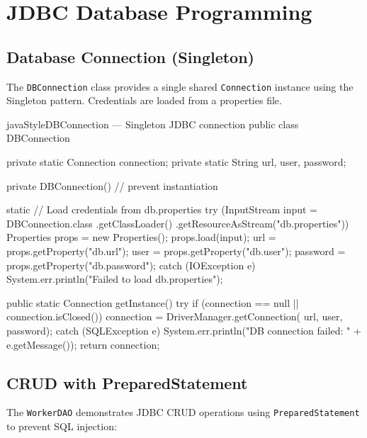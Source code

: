 \documentclass[12pt, a4paper]{report}
\begin{document}
\section{JDBC Database Programming}

\subsection{Database Connection (Singleton)}

The \texttt{DBConnection} class provides a single shared \texttt{Connection} instance using the Singleton pattern. Credentials are loaded from a properties file.

\begin{codeblock}{javaStyle}{DBConnection --- Singleton JDBC connection}
public class DBConnection {
    private static Connection connection;
    private static String url, user, password;

    private DBConnection() {} // prevent instantiation

    static {
        // Load credentials from db.properties
        try (InputStream input = DBConnection.class
                .getClassLoader()
                .getResourceAsStream("db.properties")) {
            Properties props = new Properties();
            props.load(input);
            url      = props.getProperty("db.url");
            user     = props.getProperty("db.user");
            password = props.getProperty("db.password");
        } catch (IOException e) {
            System.err.println("Failed to load db.properties");
        }
    }

    public static Connection getInstance() {
        try {
            if (connection == null || connection.isClosed()) {
                connection = DriverManager.getConnection(
                    url, user, password);
            }
        } catch (SQLException e) {
            System.err.println("DB connection failed: "
                + e.getMessage());
        }
        return connection;
    }
}
\end{codeblock}

\subsection{CRUD with PreparedStatement}

The \texttt{WorkerDAO} demonstrates JDBC CRUD operations using \texttt{PreparedStatement} to prevent SQL injection:
\end{document}
